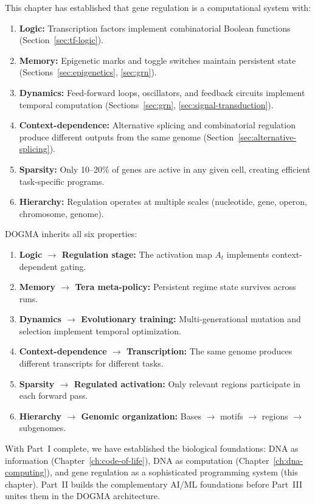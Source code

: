 This chapter has established that gene regulation is a computational system with:

\begin{enumerate}[leftmargin=1.8em]
  \item \textbf{Logic:} Transcription factors implement combinatorial Boolean functions (Section~\ref{sec:tf-logic}).
  \item \textbf{Memory:} Epigenetic marks and toggle switches maintain persistent state (Sections~\ref{sec:epigenetics}, \ref{sec:grn}).
  \item \textbf{Dynamics:} Feed-forward loops, oscillators, and feedback circuits implement temporal computation (Sections~\ref{sec:grn}, \ref{sec:signal-transduction}).
  \item \textbf{Context-dependence:} Alternative splicing and combinatorial regulation produce different outputs from the same genome (Section~\ref{sec:alternative-splicing}).
  \item \textbf{Sparsity:} Only 10--20\% of genes are active in any given cell, creating efficient task-specific programs.
  \item \textbf{Hierarchy:} Regulation operates at multiple scales (nucleotide, gene, operon, chromosome, genome).
\end{enumerate}

DOGMA inherits all six properties:
\begin{enumerate}[leftmargin=1.8em]
  \item \textbf{Logic $\to$ Regulation stage:} The activation map $A_t$ implements context-dependent gating.
  \item \textbf{Memory $\to$ Tera meta-policy:} Persistent regime state survives across runs.
  \item \textbf{Dynamics $\to$ Evolutionary training:} Multi-generational mutation and selection implement temporal optimization.
  \item \textbf{Context-dependence $\to$ Transcription:} The same genome produces different transcripts for different tasks.
  \item \textbf{Sparsity $\to$ Regulated activation:} Only relevant regions participate in each forward pass.
  \item \textbf{Hierarchy $\to$ Genomic organization:} Bases $\to$ motifs $\to$ regions $\to$ subgenomes.
\end{enumerate}

With Part~I complete, we have established the biological foundations: DNA as information (Chapter~\ref{ch:code-of-life}), DNA as computation (Chapter~\ref{ch:dna-computing}), and gene regulation as a sophisticated programming system (this chapter). Part~II builds the complementary AI/ML foundations before Part~III unites them in the DOGMA architecture.


